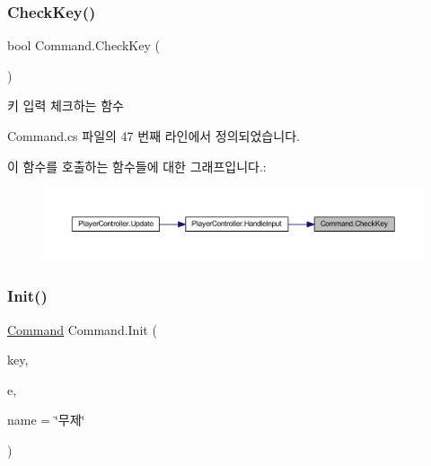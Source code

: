 \subsubsection{\texorpdfstring{CheckKey()}{CheckKey()}}
{\footnotesize\ttfamily bool Command.\+Check\+Key (\begin{DoxyParamCaption}{ }\end{DoxyParamCaption})}



키 입력 체크하는 함수 



Command.\+cs 파일의 47 번째 라인에서 정의되었습니다.


\begin{DoxyCode}{0}

\end{DoxyCode}
이 함수를 호출하는 함수들에 대한 그래프입니다.\+:
\nopagebreak
\begin{figure}[H]
\begin{center}
\leavevmode
\includegraphics[width=350pt]{d5/d6a/class_command_a1f9dcd759b1d51871f8a6efd30c3a721_icgraph}
\end{center}
\end{figure}
\mbox{\label{class_command_afc8d0350d5935d74a3685f427173d62e}} 
\subsubsection{\texorpdfstring{Init()}{Init()}\hspace{0.1cm}{\footnotesize\ttfamily [1/2]}}
{\footnotesize\ttfamily \mbox{\hyperlink{class_command}{Command}} Command.\+Init (\begin{DoxyParamCaption}\item[{Key\+Code}]{key,  }\item[{\mbox{\hyperlink{class_command_acc714b5e0de57b7f24b2619fff860b9d}{Key\+Down\+Event}}}]{e,  }\item[{string}]{name = {\ttfamily \char`\"{}무제\char`\"{}} }\end{DoxyParamCaption})}



